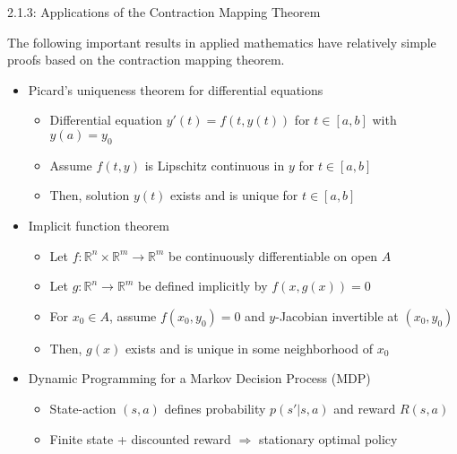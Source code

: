 \documentclass[10pt,english]{beamer}
\begin{document}
\begin{frame}{2.1.3: Applications of the Contraction Mapping Theorem}

The following important results in applied mathematics have relatively simple proofs based on the contraction mapping theorem.
\vspace{2mm}

\begin{itemize}
\setlength\itemsep{3mm}
\item<1-> Picard's uniqueness theorem for differential equations \vspace{1mm}
\begin{itemize} 
  \setlength\itemsep{1.5mm}
  \item Differential equation $y'(t) = f(t,y(t))$ for $t\in [a,b]$ with $y(a)=y_0$ 
  \item  Assume $f(t,y)$ is Lipschitz continuous in $y$ for $t\in [a,b]$
  \item Then, solution $y(t)$ exists and is unique for $t\in [a,b]$
\end{itemize}
\item<2-> Implicit function theorem \vspace{1mm}
\begin{itemize} 
  \setlength\itemsep{1.5mm}
  \item Let $f\colon \mathbb{R}^n \times \mathbb{R}^{m} \to \mathbb{R}^m$ be continuously differentiable on open $A$
  \item Let $g\colon \mathbb{R}^n \to \mathbb{R}^{m}$ be defined implicitly by $f(x,g(x))=0$
  \item For $x_0\in A$, assume $f(x_0,y_0)=0$ and $y$-Jacobian invertible at $(x_0,y_0)$
  \item Then, $g(x)$ exists and is unique in some neighborhood of $x_0$
\end{itemize}
\item<3-> Dynamic Programming for a Markov Decision Process (MDP) \vspace{1mm}
\begin{itemize} 
  \setlength\itemsep{1.5mm}
  \item State-action $(s,a)$ defines probability $p(s'|s,a)$ and reward $R(s,a)$
  \item Finite state + discounted reward $\Rightarrow$ stationary optimal policy
\end{itemize}
\end{itemize}

\end{frame}
\end{document}
